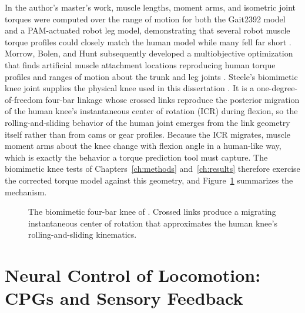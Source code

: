 In the author's master's work, muscle lengths, moment arms, and isometric joint torques were computed over the range of motion for both the Gait2392 model and a PAM-actuated robot leg model, demonstrating that several robot muscle torque profiles could closely match the human model while many fell far short \citep{bolen_bipedal_2019, bolen_determination_2019}. Morrow, Bolen, and Hunt subsequently developed a multiobjective optimization that finds artificial muscle attachment locations reproducing human torque profiles and ranges of motion about the trunk and leg joints \citep{morrow_optimization_2020}. Steele's biomimetic knee joint supplies the physical knee used in this dissertation \citep{steele_development_2017, steele_biomimetic_2018, steele_biomimetic_2018-1}. It is a one-degree-of-freedom four-bar linkage whose crossed links reproduce the posterior migration of the human knee's instantaneous center of rotation (ICR) during flexion, so the rolling-and-sliding behavior of the human joint emerges from the link geometry itself rather than from cams or gear profiles. Because the ICR migrates, muscle moment arms about the knee change with flexion angle in a human-like way, which is exactly the behavior a torque prediction tool must capture. The biomimetic knee tests of Chapters~\ref{ch:methods} and~\ref{ch:results} therefore exercise the corrected torque model against this geometry, and Figure~\ref{fig:steele_knee} summarizes the mechanism.

\begin{figure}[htbp]
\centering
\caption{The biomimetic four-bar knee of \citet{steele_development_2017, steele_biomimetic_2018, steele_biomimetic_2018-1}. Crossed links produce a migrating instantaneous center of rotation that approximates the human knee's rolling-and-sliding kinematics.}
\label{fig:steele_knee}
\end{figure}

\section{Neural Control of Locomotion: CPGs and Sensory Feedback}\label{sec:bg_neural}

